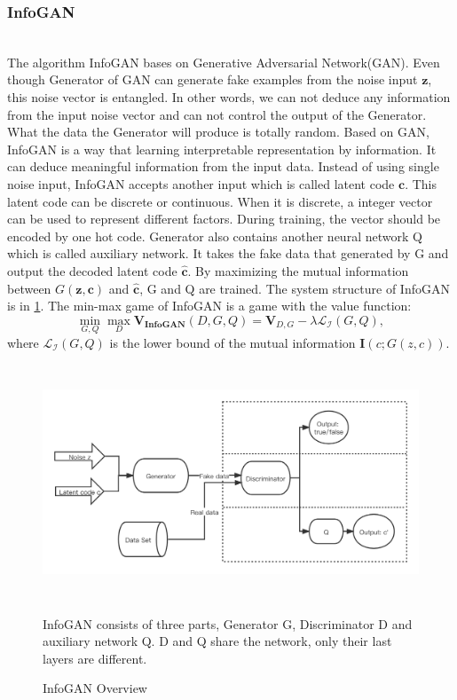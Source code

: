 \subsubsection{InfoGAN}

\hfill \\
The algorithm InfoGAN bases on Generative Adversarial Network(GAN). Even though Generator of GAN can generate fake examples from the noise input \(\mathbf{z}\), this noise vector is entangled. In other words, we can not deduce any information from the input noise vector and can not control the output of the Generator. What the data the Generator will produce is totally random. Based on GAN, InfoGAN is a way that learning interpretable representation by information. It can deduce meaningful information from the input data. Instead of using single noise input, InfoGAN accepts another input which is called latent code \(\mathbf{c}\). This latent code can be discrete or continuous. When it is discrete, a integer vector can be used to represent different factors. During training, the vector should be encoded by one hot code. Generator also contains another neural network Q which is called auxiliary network. It takes the fake data that generated by G and output the decoded latent code \( \mathbf{\hat{c}}\). By maximizing the mutual information between \( G(\mathbf{z, c})\) and \( \mathbf{\hat{c}}\), G and Q are trained. The system structure of InfoGAN is in \ref{infoGan}. The min-max game of InfoGAN is a game with the value function\cite{infogan}:
\[\min_{G,Q}\max_{D} \mathbf{V_{InfoGAN}}(D, G, Q) = \mathbf{V}_{D, G} - \lambda \mathcal{L_I}(G,Q),\] where \(\mathcal{L_I}(G,Q)\) is the lower bound of the mutual information \(\mathbf{I}(c;G(z,c))\).
\begin{figure}[h]
  \centering
  \includegraphics[width=\textwidth, height = 7cm]{figures/infoGAN.png}
  \caption{InfoGAN Overview}{InfoGAN consists of three parts, Generator G, Discriminator D and auxiliary network Q. D and Q share the network, only their last layers are different.}
  \label{infoGan}
\end{figure}
